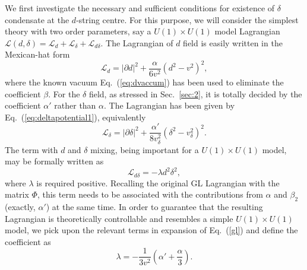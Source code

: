 \documentclass[prd, showpacs,nofootinbib,amsmath,amssymb]{revtex4}
\begin{document}
We first investigate the necessary and sufficient conditions for existence of $\delta$ condensate
at the $d$-string centre.
For this purpose, we will consider the simplest theory with two order parameters, say
a $U(1) \times U(1)$ model Lagrangian $\mathcal{L}(d,\delta)= \mathcal{L}_d +
\mathcal{L}_\delta + \mathcal{L}_{d\delta}$.
The Lagrangian of $d$ field is easily written in the Mexican-hat form
\begin{equation}
  \label{eq:vortonb}
  \mathcal{L}_d  = |\partial d|^2 +\frac{\alpha}{6 v^2}(d^2 - v^2)^2,
\end{equation}
where the known vacuum Eq.~(\ref{eq:dvaccum}) has been used to eliminate the coefficient $\beta$.
For the $\delta$ field, as stressed in Sec.~\ref{sec:2}, it is totally decided by the coefficient
$\alpha'$ rather than $\alpha$. The Lagrangian has been given by Eq.~(\ref{eq:deltapotential1}), equivalently
\begin{equation}
  \label{eq:vortond}
  \mathcal{L}_\delta = |\partial \delta|^2 + \frac{\alpha'}{8 v_\delta^2}(\delta^2 - v_\delta^2)^2.
\end{equation}
The term with $d$ and $\delta$ mixing, being important for a $U(1) \times U(1)$ model,  may be formally written as
\begin{equation}
  \label{eq:vortoninter}
  \mathcal{L}_{d\delta} = -\lambda d^2 \delta^2,
\end{equation}
where $\lambda$ is required positive.
Recalling the original GL Lagrangian with the matrix $\Phi$, this term needs to
be associated with the contributions from $\alpha$ and $\beta_2$ (exactly, $\alpha'$) at the same time. In order to guarantee
that the resulting Lagrangian is theoretically controllable and resembles a
simple $U(1) \times U(1)$ model, we pick upon the relevant terms
in expansion of Eq.~(\ref{gl}) and define the coefficient as
\begin{equation}
  \label{eq:vortoninter1}
  \lambda = -\frac{1}{3 v^2}(\alpha' +\frac{\alpha}{3}).
\end{equation}
\end{document}
